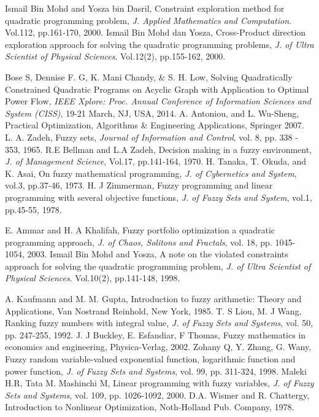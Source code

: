 \documentclass{iaesarticle3}
\begin{document}
\begin{thebibliography}{4}


    Ismail Bin Mohd and Yosza bin Dasril, Constraint exploration method for quadratic programming problem, \emph{J. Applied Mathematics and Computation}. Vol.112, pp.161-170, 2000.
    Ismail Bin Mohd dan Yosza, Cross-Product direction exploration approach for solving the quadratic programming problems, \emph{J. of Ultra Scientist of Physical Sciences}. Vol.12(2), pp.155-162, 2000.

    Bose S, Dennise F. G, K. Mani Chandy, \& S. H. Low, Solving Quadratically Constrained Quadratic Programs on Acyclic Graph with Application to Optimal Power Flow, \emph{IEEE Xplore: Proc. Annual Conference of Information Sciences and System (CISS)}, 19-21 March, NJ, USA, 2014.
    A. Antoniou, and L. Wu-Sheng, Practical Optimization, Algorithms \& Engineering Applications, Springer 2007.
    L. A. Zadeh, Fuzzy sets, \emph{Journal of Information and Control}, vol. 8, pp. 338 - 353, 1965.
    R.E Bellman and L.A Zadeh, Decision making in a fuzzy environment, \emph{J. of Management Science}, Vol.17, pp.141-164, 1970.
    H. Tanaka, T. Okuda, and K. Asai, On fuzzy mathematical programming, \emph{J. of Cybernetics and System}, vol.3, pp.37-46, 1973.
    H. J Zimmerman, Fuzzy programming and linear programming with several objective functions, \emph{J. of Fuzzy Sets and System}, vol.1, pp.45-55, 1978.

    E. Ammar and H. A Khalifah, Fuzzy portfolio optimization a quadratic programming approach, \emph{J. of Chaos, Solitons and Fractals}, vol. 18, pp. 1045-1054,  2003.
    Ismail Bin Mohd and Yosza, A note on the violated constraints approach for solving the quadratic programming problem, \emph{J. of Ultra Scientist of Physical Sciences}.  Vol.10(2), pp.141-148, 1998.

    A. Kaufmann and M. M. Gupta, Introduction to fuzzy arithmetic: Theory and Applications, Van Nostrand Reinhold, New York, 1985.
    T. S Liou, M. J Wang, Ranking fuzzy numbers with integral value, \emph{J. of Fuzzy Sets and Systems}, vol. 50, pp. 247-255, 1992.
    J. J Buckley, E. Esfandiar, F Thomas, Fuzzy mathematics in economics and engineering, Physica-Verlag, 2002.
    Zohany Q, Y. Zhang, G. Wany, Fuzzy random variable-valued exponential function, logarithmic function and power function, \emph{J. of Fuzzy Sets and Systems}, vol. 99, pp. 311-324, 1998.
    Maleki H.R, Tata M. Mashinchi M, Linear programming with fuzzy variables, \emph{J. of Fuzzy Sets and Systems}, vol. 109, pp. 1026-1092, 2000.
    D.A. Wismer and R. Chattergy, Introduction to Nonlinear Optimization, Noth-Holland Pub. Company, 1978.
\end{thebibliography}
\end{document}
